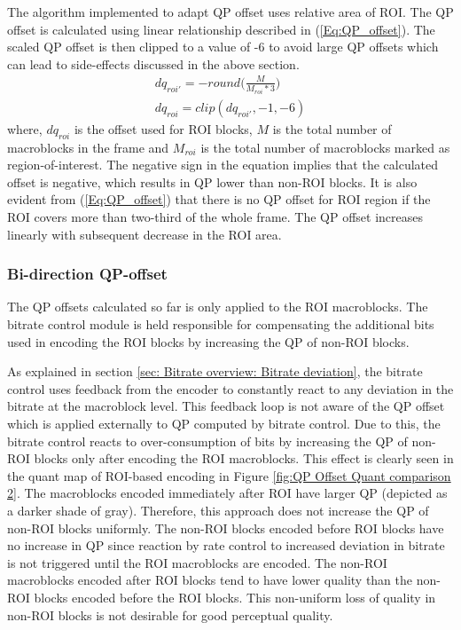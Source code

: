 \documentclass[11pt]{article} %
\begin{document}
The algorithm implemented to adapt QP offset uses relative area of ROI. The QP offset is calculated using linear relationship described in (\ref{Eq:QP_offset}). The scaled QP offset is then clipped to a value of -6 to avoid large QP offsets which can lead to side-effects discussed in the above section.
\begin{equation}
	\label{Eq:QP_offset}
	\begin{aligned}
	dq_{roi'} = -round\Big(\frac{M}{M_{roi} * 3}\Big) \\
	dq_{roi} = clip(dq_{roi'}, -1 , -6)
	\end{aligned}	
\end{equation}
where, $dq_{roi}$ is the offset used for ROI blocks, $M$ is the total number of macroblocks in the frame and $M_{roi}$ is the total number of macroblocks marked as region-of-interest. The negative sign in the equation implies that the calculated offset is negative, which results in QP lower than non-ROI blocks. It is also evident from (\ref{Eq:QP_offset}) that there is no QP offset for ROI region if the ROI covers more than two-third of the whole frame. The QP offset increases linearly with subsequent decrease in the ROI area.

\subsubsection{Bi-direction QP-offset}
The QP offsets calculated so far is only applied to the ROI macroblocks. The bitrate control module is held responsible for compensating the additional bits used in encoding the ROI blocks by increasing the QP of non-ROI blocks. 

As explained in section \ref{sec: Bitrate overview: Bitrate deviation}, the bitrate control uses feedback from the encoder to constantly react to any deviation in the bitrate at the macroblock level. This feedback loop is not aware of the QP offset which is applied externally to QP computed by bitrate control. Due to this, the bitrate control reacts to over-consumption of bits by increasing the QP of non-ROI blocks only after encoding the ROI macroblocks. This effect is clearly seen in the quant map of ROI-based encoding in Figure \ref{fig:QP Offset Quant comparison 2}. The macroblocks encoded immediately after ROI have larger QP (depicted as a darker shade of gray). Therefore, this approach does not increase the QP of non-ROI blocks uniformly. The non-ROI blocks encoded before ROI blocks have no increase in QP since reaction by rate control to increased deviation in bitrate is not triggered until the ROI macroblocks are encoded. The non-ROI macroblocks encoded after ROI blocks tend to have lower quality than the non-ROI blocks encoded before the ROI blocks. This non-uniform loss of quality in non-ROI blocks is not desirable for good perceptual quality.
\end{document}
